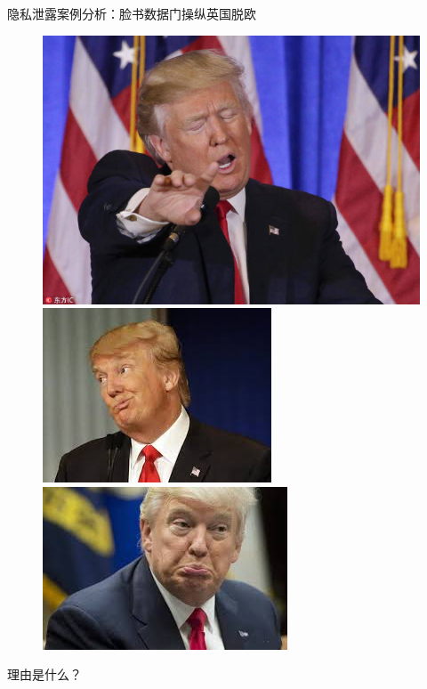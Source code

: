 \documentclass[11pt]{beamer}
\begin{document}
\begin{frame}[allowframebreaks]{隐私泄露案例分析：脸书数据门操纵英国脱欧}
\begin{figure}
{\begin{minipage}[t]{0.3\linewidth}
			\centering
			\includegraphics[width=0.6\linewidth,height=0.2\textheight]{figures/privacy/trump/7}\\
			\vspace{0.02cm}
			\includegraphics[width=0.6\linewidth,height=0.2\textheight]{figures/privacy/trump/8}\\
			\vspace{0.02cm}
			\includegraphics[width=0.6\linewidth,height=0.2\textheight]{figures/privacy/trump/9}\\
			\vspace{0.02cm}
		\end{minipage}%
	}
	\end{figure}

	\newpage
	
	理由是什么？
	
	\newpage
    

\end{frame}
\end{document}
